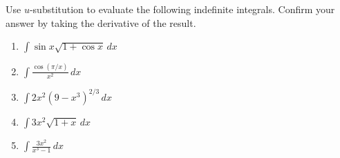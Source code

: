 \begin{Exercise}[title = {Indefinite Integrals and u-substitution}, 
label = u_indef]
Use $u$-substitution to evaluate the following indefinite integrals. Confirm 
your answer by taking the derivative of the result. 
\begin{enumerate}
    \item $\int \sin{x} \sqrt{1 + \cos{x}}\,dx$
    \item $\int \frac{\cos{ \left( \pi / x \right)}}{x^2}\,dx$
    \item $\int 2x^2 \left( 9 - x^3 \right)^{2/3}\,dx$
    \item $\int 3x^2 \sqrt{1 + x}\,dx$
    \item $\int \frac{3x^2}{x^3 - 1}\,dx$
\end{enumerate}
\end{Exercise}

